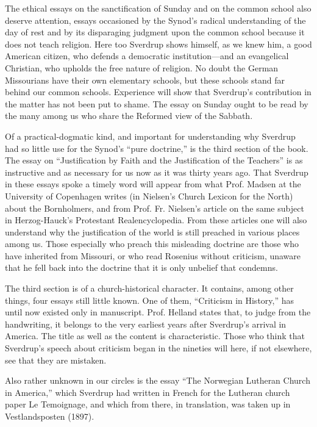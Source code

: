 The ethical essays on the sanctification of Sunday and on the common school also deserve attention, essays occasioned by the Synod’s radical understanding of the day of rest and by its disparaging judgment upon the common school because it does not teach religion. Here too Sverdrup shows himself, as we knew him, a good American citizen, who defends a democratic institution—and an evangelical Christian, who upholds the free nature of religion. No doubt the German Missourians have their own elementary schools, but these schools stand far behind our common schools. Experience will show that Sverdrup’s contribution in the matter has not been put to shame. The essay on Sunday ought to be read by the many among us who share the Reformed view of the Sabbath.

Of a practical-dogmatic kind, and important for understanding why Sverdrup had so little use for the Synod’s “pure doctrine,” is the third section of the book. The essay on “Justification by Faith and the Justification of the Teachers” is as instructive and as necessary for us now as it was thirty years ago. That Sverdrup in these essays spoke a timely word will appear from what Prof. Madsen at the University of Copenhagen writes (in Nielsen’s Church Lexicon for the North) about the Bornholmers, and from Prof. Fr. Nielsen’s article on the same subject in Herzog-Hauck’s Protestant Realencyclopedia. From these articles one will also understand why the justification of the world is still preached in various places among us. Those especially who preach this misleading doctrine are those who have inherited from Missouri, or who read Rosenius without criticism, unaware that he fell back into the doctrine that it is only unbelief that condemns.

The third section is of a church-historical character. It contains, among other things, four essays still little known. One of them, “Criticism in History,” has until now existed only in manuscript. Prof. Helland states that, to judge from the handwriting, it belongs to the very earliest years after Sverdrup’s arrival in America. The title as well as the content is characteristic. Those who think that Sverdrup’s speech about criticism began in the nineties will here, if not elsewhere, see that they are mistaken.

Also rather unknown in our circles is the essay “The Norwegian Lutheran Church in America,” which Sverdrup had written in French for the Lutheran church paper Le Temoignage, and which from there, in translation, was taken up in Vestlandsposten (1897).

